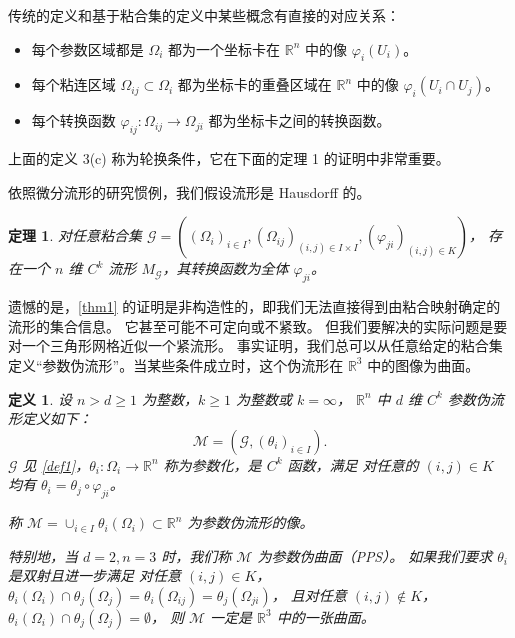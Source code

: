 \documentclass{ctexart}
\newtheorem{Thm}{定理}
\newtheorem{Def}{定义}
\begin{document}
	传统的定义和基于粘合集的定义中某些概念有直接的对应关系：

	\begin{itemize}
		\item 每个参数区域都是 $\Omega_i$ 都为一个坐标卡在 $\mathbb{R}^n$ 中的像 $\varphi_i(U_i)$。
		\item 每个粘连区域 $\Omega_{ij}\subset \Omega_i$ 都为坐标卡的重叠区域在 $\mathbb{R}^n$ 中的像 $\varphi_i(U_i\cap U_j)$。
		\item 每个转换函数 $\varphi_{ij}:\Omega_{ij}\rightarrow \Omega_{ji}$ 都为坐标卡之间的转换函数。
	\end{itemize}

	上面的定义 3(c) 称为轮换条件，它在下面的定理 1 的证明中非常重要。

	依照微分流形的研究惯例，我们假设流形是 Hausdorff 的。

	\begin{Thm}\label{PGM-thm}
		对任意粘合集 $\mathcal{G} = ((\Omega_i)_{i\in I},(\Omega_{ij})_{(i,j)\in I\times I},(\varphi_{ji})_{(i,j)\in K})$，
		存在一个 $n$ 维 $C^k$ 流形 $M_\mathcal{G}$，其转换函数为全体 $\varphi_{ji}$。
	\end{Thm}

	遗憾的是，\ref{thm1} 的证明是非构造性的，即我们无法直接得到由粘合映射确定的流形的集合信息。
	它甚至可能不可定向或不紧致。
	但我们要解决的实际问题是要对一个三角形网格近似一个紧流形。
	事实证明，我们总可以从任意给定的粘合集定义“参数伪流形”。当某些条件成立时，这个伪流形在 $\mathbb{R}^3$ 中的图像为曲面。

	\begin{Def}\label{PPM-def}
		设 $n>d\geq 1$ 为整数，$k\geq 1$ 为整数或 $k=\infty$，
		$\mathbb{R}^n$ 中 $d$ 维 $C^k$ 参数伪流形定义如下：
		\begin{equation}
			\mathcal{M}=(\mathcal{G},(\theta_i)_{i\in I}).
		\end{equation}
		$\mathcal{G}$ 见 \ref{def1}，$\theta_i:\Omega_i\rightarrow \mathbb{R}^n$ 称为参数化，是 $C^k$ 函数，满足
		对任意的 $(i,j)\in K$ 均有 $\theta_i=\theta_j\circ \varphi_{ji}$。

		称 $\mathcal{M}=\cup_{i\in I}\theta_i(\Omega_i) \subset \mathbb{R}^n$ 为参数伪流形的像。

		特别地，当 $d=2,n=3$ 时，我们称 $\mathcal{M}$ 为参数伪曲面（PPS）。
		如果我们要求 $\theta_i$ 是双射且进一步满足
		对任意 $(i,j)\in K$，$\theta_i(\Omega_i)\cap \theta_j(\Omega_j) = \theta_i(\Omega_{ij}) = \theta_j(\Omega_{ji})$，
		且对任意 $(i,j)\notin K$， $\theta_i(\Omega_i)\cap \theta_j(\Omega_j) = \emptyset$，
		则 $\mathcal{M}$ 一定是 $\mathbb{R}^3$ 中的一张曲面。
	\end{Def}
\end{document}
